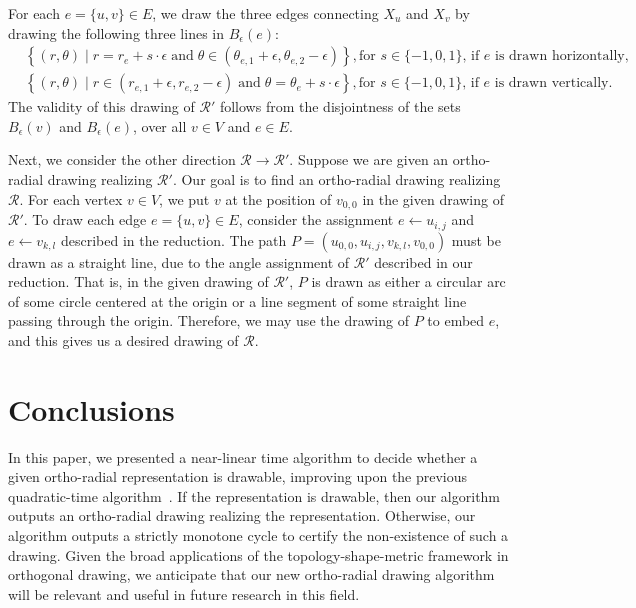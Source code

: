 \documentclass{theoretics}
\newcommand{\RR}{\mathcal{R}}
\begin{document}
For each $e=\{u,v\} \in E$, we draw the three edges connecting $X_u$ and $X_v$ by drawing the following three lines in $B_\epsilon(e)$:
\begin{align*}
    & \left\{ (r, \theta) \mid r= r_e +  s \cdot \epsilon \; \text{and} \; \theta \in (\theta_{e,1} + \epsilon, \theta_{e,2} - \epsilon)\right\}, \text{for $s \in \{-1, 0, 1\}$, if $e$ is drawn horizontally,}\\
    & \left\{ (r, \theta) \mid r\in(r_{e,1} + \epsilon, r_{e,2} - \epsilon) \; \text{and} \; \theta = \theta_e +  s \cdot \epsilon\right\},  \text{for $s \in \{-1, 0, 1\}$, if $e$ is drawn vertically.}
\end{align*}
The validity of this drawing of $\RR'$ follows from the disjointness of the sets $B_\epsilon(v)$ and $B_\epsilon(e)$, over all $v\in V$ and $e\in E$.
 
Next, we consider the other direction $\RR \rightarrow \RR'$.  Suppose we are given an ortho-radial drawing realizing $\RR'$. Our goal is to find an ortho-radial drawing realizing $\RR$. For each vertex $v \in V$, we put $v$ at the position of $v_{0,0}$ in the given drawing of $\RR'$. 
To draw each edge $e=\{u,v\} \in E$, consider the assignment $e \leftarrow u_{i,j}$ and  $e \leftarrow v_{k,l}$ described in the reduction. The path $P = (u_{0,0}, u_{i,j}, v_{k,l}, v_{0,0})$ must be drawn as a straight line, due to the angle assignment of $\RR'$ described in our reduction. That is, in the given drawing of $\RR'$, $P$ is drawn as either a circular arc of some circle centered
at the origin or a line segment of some straight line passing through the origin. Therefore, we may use the drawing of $P$ to embed $e$, and this gives us a desired drawing of $\RR$. 


\section{Conclusions}\label{sect:conclusions}

In this paper, we presented a near-linear time algorithm to decide whether a given ortho-radial representation is drawable, improving upon the previous quadratic-time algorithm~\cite{barth2023topology}. If the representation is drawable, then our algorithm outputs an ortho-radial drawing realizing the representation. Otherwise, our algorithm outputs a strictly monotone cycle to certify the non-existence of such a drawing. Given the broad applications of the topology-shape-metric framework in orthogonal drawing, we anticipate that our new ortho-radial drawing algorithm will be relevant and useful in future research in this field.
\end{document}
